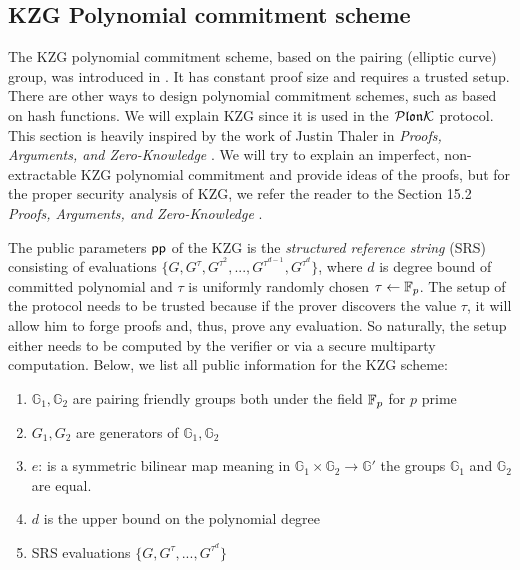 

\subsection{KZG Polynomial commitment scheme}
The KZG polynomial commitment scheme, based on the pairing (elliptic curve) group, was introduced in \cite{KZG}. It has constant proof size and requires a trusted setup. There are other ways to design polynomial commitment schemes, such as \cite{fri} based on hash functions. We will explain KZG since it is used in the $\mathcal{P}\mathfrak{lon}\mathcal{K}$ protocol. This section is heavily inspired by the work of Justin Thaler in \textit{Proofs, Arguments, and Zero-Knowledge} \cite{ProofArgsAndZk}. We will try to explain an imperfect, non-extractable KZG polynomial commitment and provide ideas of the proofs, but for the proper security analysis of KZG, we refer the reader to the Section 15.2 \textit{Proofs, Arguments, and Zero-Knowledge} \cite{ProofArgsAndZk}.

The public parameters $\mathsf{pp}$ of the KZG is the \textit{structured reference string} (SRS) consisting of evaluations $\{G, G^{\tau}, G^{\tau^2}, ..., G^{\tau^{d-1}}, G^{\tau^{d}}\}$, where $d$ is degree bound of committed polynomial and $\tau$ is uniformly randomly chosen $\tau \gets \mathbb{F}_p$. The setup of the protocol needs to be trusted because if the prover discovers the value $\tau$, it will allow him to forge proofs and, thus, prove any evaluation. So naturally, the setup either needs to be computed by the verifier or via a secure multiparty computation. Below, we list all public information for the KZG scheme:

\begin{enumerate}
    \item $\mathbb{G}_1, \mathbb{G}_2$ are pairing friendly groups both under the field  $\mathbb{F}_p$ for $p$ prime
    \item $G_1, G_2$ are generators of $\mathbb{G}_1, \mathbb{G}_2$
    \item $e$: is a symmetric bilinear map meaning in $\mathbb{G}_1 \times \mathbb{G}_2 \rightarrow \mathbb{G}'$ the groups $\mathbb{G}_1$ and $\mathbb{G}_2$ are equal.
    \item $d$ is the upper bound on the polynomial degree
    \item SRS evaluations $\{G, G^{\tau}, ... ,G^{\tau^d}\}$
\end{enumerate}

